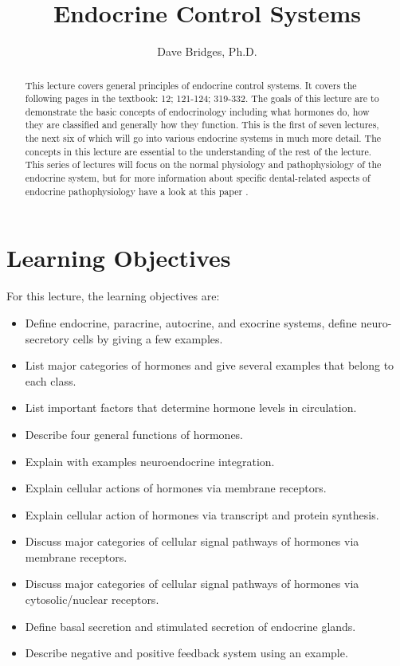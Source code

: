 \documentclass{tufte-handout}
\title{Endocrine Control Systems}
\author{Dave Bridges, Ph.D.}
\begin{document}
\maketitle%

\begin{abstract}
\noindent This lecture covers general principles of endocrine control systems.  It covers the following pages in the textbook: 12; 121-124; 319-332\cite{Widmaier2013}.  The goals of this lecture are to demonstrate the basic concepts of endocrinology including what hormones do, how they are classified and generally how they function.  This is the first of seven lectures, the next six of which will go into various endocrine systems in much more detail.  The concepts in this lecture are essential to the understanding of the rest of the lecture.  This series of lectures will focus on the normal physiology and pathophysiology of the endocrine system, but for more information about specific dental-related aspects of endocrine pathophysiology have a look at this paper \cite{Carlos2010}.
\end{abstract}

\tableofcontents

\pagebreak

\section{Learning Objectives}
For this lecture, the learning objectives are:
\begin{itemize}
\item Define endocrine, paracrine, autocrine, and exocrine systems, define neuro-secretory cells by giving a few examples.
\item List major categories of hormones and give several examples that belong to each class.
\item List important factors that determine hormone levels in circulation.
\item Describe four general functions of hormones.
\item Explain with examples neuroendocrine integration.
\item Explain cellular actions of hormones via membrane receptors.
\item Explain cellular action of hormones via transcript and protein synthesis.
\item Discuss major categories of cellular signal pathways of hormones via membrane receptors.
\item Discuss major categories of cellular signal pathways of hormones via cytosolic/nuclear receptors.
\item Define basal secretion and stimulated secretion of endocrine glands.
\item Describe negative and positive feedback system using an example.
\end{itemize}
\end{document}
